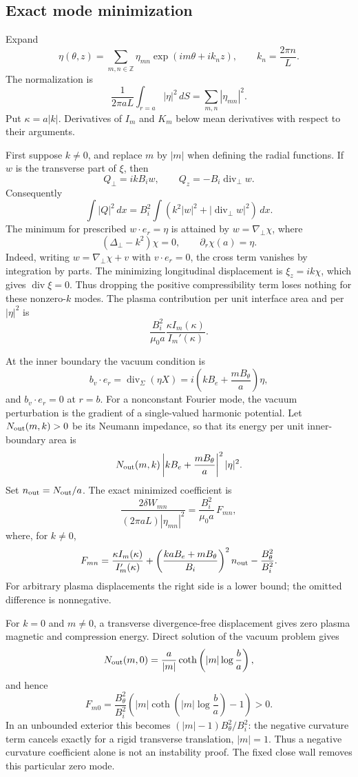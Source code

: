 \subsection{Exact mode minimization}

Expand
\[
 \eta(\theta,z)=\sum_{m,n\in\mathbb Z}
       \eta_{mn}\exp(i m\theta+i k_nz),
 \qquad k_n=\frac{2\pi n}{L}.
\]
The normalization is
\[
 \frac{1}{2\pi aL}\int_{r=a}|\eta|^2\,dS
   =\sum_{m,n}|\eta_{mn}|^2.
\]
Put $\kappa=a|k|$.  Derivatives of $I_m$ and $K_m$ below mean derivatives
with respect to their arguments.

First suppose $k\ne0$, and replace $m$ by $|m|$ when defining the radial
functions.  If $w$ is the transverse part of $\xi$, then
\[
 Q_\perp=i kB_iw,\qquad Q_z=-B_i\operatorname{div}_\perp w.
\]
Consequently
\[
 \int |Q|^2\,dx
  =B_i^2\int\left(k^2|w|^2+
                         |\operatorname{div}_\perp w|^2\right)\,dx.
\]
The minimum for prescribed $w\cdot e_r=\eta$ is attained by
$w=\nabla_\perp\chi$, where
\[
 (\Delta_\perp-k^2)\chi=0,
 \qquad \partial_r\chi(a)=\eta.
\]
Indeed, writing $w=\nabla_\perp\chi+v$ with $v\cdot e_r=0$, the cross term
vanishes by integration by parts.  The minimizing longitudinal
displacement is $\xi_z=i k\chi$, which gives
$\operatorname{div}\xi=0$.  Thus dropping the positive compressibility
term loses nothing for these nonzero-$k$ modes.  The plasma contribution
per unit interface area and per $|\eta|^2$ is
\[
 \frac{B_i^2}{\mu_0a}
       \frac{\kappa I_m(\kappa)}{I_m'(\kappa)}.
\]

At the inner boundary the vacuum condition is
\[
 b_v\cdot e_r=\operatorname{div}_{\Sigma}(\eta X)
       =i\left(kB_e+\frac{mB_\theta}{a}\right)\eta,
\]
and $b_v\cdot e_r=0$ at $r=b$.  For a nonconstant Fourier mode, the vacuum
perturbation is the gradient of a single-valued harmonic potential.  Let
$N_{\rm out}(m,k)>0$ be its Neumann impedance, so that its energy per unit
inner-boundary area is
\[
 N_{\rm out}(m,k)
       \left|kB_e+\frac{mB_\theta}{a}\right|^2|\eta|^2.
\]
Set $n_{\rm out}=N_{\rm out}/a$.  The exact minimized coefficient is
\[
 \frac{2\delta W_{mn}}
      {(2\pi aL)|\eta_{mn}|^2}
 =\frac{B_i^2}{\mu_0a}\,F_{mn},
\]
where, for $k\ne0$,
\[
 F_{mn}=
 \frac{\kappa I_m(\kappa)}{I_m'(\kappa)}
 +\left(\frac{k aB_e+mB_\theta}{B_i}\right)^2 n_{\rm out}
 -\frac{B_\theta^2}{B_i^2}.
\]
For arbitrary plasma displacements the right side is a lower bound;
the omitted difference is nonnegative.

For $k=0$ and $m\ne0$, a transverse divergence-free displacement gives
zero plasma magnetic and compression energy.  Direct solution of the
vacuum problem gives
\[
 N_{\rm out}(m,0)=\frac{a}{|m|}
        \coth\left(|m|\log\frac ba\right),
\]
and hence
\[
 F_{m0}=\frac{B_\theta^2}{B_i^2}
     \left(|m|\coth\left(|m|\log\frac ba\right)-1\right)>0.
\]
In an unbounded exterior this becomes
$(|m|-1)B_\theta^2/B_i^2$: the negative curvature term cancels exactly
for a rigid transverse translation, $|m|=1$.  Thus a negative curvature
coefficient alone is not an instability proof.  The fixed close wall
removes this particular zero mode.

